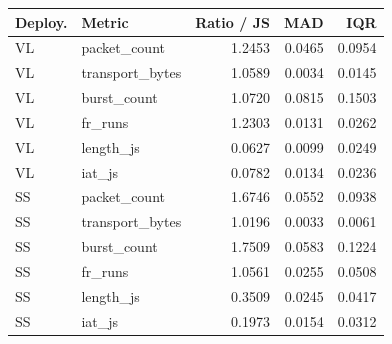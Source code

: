 \begin{tabular}{llrrr}
\toprule
Deploy. & Metric & Ratio / JS & MAD & IQR \\
\midrule
VL & packet\_count & 1.2453 & 0.0465 & 0.0954 \\
VL & transport\_bytes & 1.0589 & 0.0034 & 0.0145 \\
VL & burst\_count & 1.0720 & 0.0815 & 0.1503 \\
VL & fr\_runs & 1.2303 & 0.0131 & 0.0262 \\
VL & length\_js & 0.0627 & 0.0099 & 0.0249 \\
VL & iat\_js & 0.0782 & 0.0134 & 0.0236 \\
SS & packet\_count & 1.6746 & 0.0552 & 0.0938 \\
SS & transport\_bytes & 1.0196 & 0.0033 & 0.0061 \\
SS & burst\_count & 1.7509 & 0.0583 & 0.1224 \\
SS & fr\_runs & 1.0561 & 0.0255 & 0.0508 \\
SS & length\_js & 0.3509 & 0.0245 & 0.0417 \\
SS & iat\_js & 0.1973 & 0.0154 & 0.0312 \\
\bottomrule
\end{tabular}

